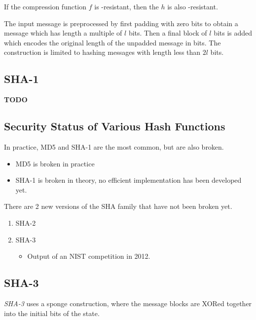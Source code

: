 \begin{theorem}
  If the compression function $f$ is -resistant, then the  $h$ is also -resistant.
\end{theorem}

\begin{definition}\label{def:Length_Strengthening}
  The input message is preprocessed by first padding with zero bits to obtain a message which has length a multiple of $l$ bits.
  Then a final block of $l$ bits is added which encodes the original length of the unpadded message in bits.
  The construction is limited to hashing messages with length less than $2l$ bits.
\end{definition}

\subsection{SHA-1}\label{subsec:SHA_1}
\textbf{TODO}

\subsection{Security Status of Various Hash Functions}\label{subsec:Hash_Functions_Security_Status}
In practice, MD5 and SHA-1 are the most common, but are also broken.
\begin{itemize}[noitemsep]
\item MD5 is broken in practice
\item SHA-1 is broken in theory, no efficient implementation has been developed yet.
\end{itemize}

There are 2 new versions of the SHA family that have not been broken yet.
\begin{enumerate}[noitemsep]
\item SHA-2
\item SHA-3
  \begin{itemize}[noitemsep]
  \item Output of an NIST competition in 2012.
  \end{itemize}
\end{enumerate}

\subsection{SHA-3}\label{subsec:SHA_3}
\begin{definition}[SHA-3]\label{def:SHA_3}
  \emph{SHA-3} uses a sponge construction, where the message blocks are XORed together into the initial bits of the state.
\end{definition}

